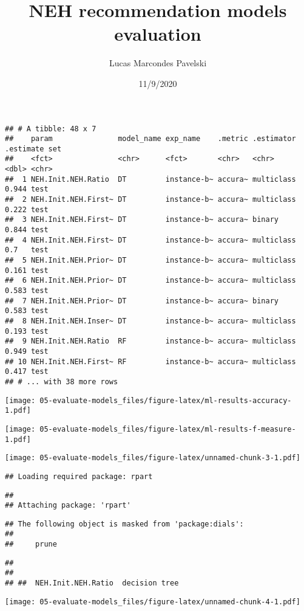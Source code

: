 \documentclass[
]{article}
\title{NEH recommendation models evaluation}
\author{Lucas Marcondes Pavelski}
\date{11/9/2020}
\begin{document}
\maketitle

\begin{verbatim}
## # A tibble: 48 x 7
##    param               model_name exp_name    .metric .estimator .estimate set  
##    <fct>               <chr>      <fct>       <chr>   <chr>          <dbl> <chr>
##  1 NEH.Init.NEH.Ratio  DT         instance-b~ accura~ multiclass     0.944 test 
##  2 NEH.Init.NEH.First~ DT         instance-b~ accura~ multiclass     0.222 test 
##  3 NEH.Init.NEH.First~ DT         instance-b~ accura~ binary         0.844 test 
##  4 NEH.Init.NEH.First~ DT         instance-b~ accura~ multiclass     0.7   test 
##  5 NEH.Init.NEH.Prior~ DT         instance-b~ accura~ multiclass     0.161 test 
##  6 NEH.Init.NEH.Prior~ DT         instance-b~ accura~ multiclass     0.583 test 
##  7 NEH.Init.NEH.Prior~ DT         instance-b~ accura~ binary         0.583 test 
##  8 NEH.Init.NEH.Inser~ DT         instance-b~ accura~ multiclass     0.193 test 
##  9 NEH.Init.NEH.Ratio  RF         instance-b~ accura~ multiclass     0.949 test 
## 10 NEH.Init.NEH.First~ RF         instance-b~ accura~ multiclass     0.417 test 
## # ... with 38 more rows
\end{verbatim}

\texttt{[image: 05-evaluate-models\_files/figure-latex/ml-results-accuracy-1.pdf]}

\texttt{[image: 05-evaluate-models\_files/figure-latex/ml-results-f-measure-1.pdf]}

\texttt{[image: 05-evaluate-models\_files/figure-latex/unnamed-chunk-3-1.pdf]}

\begin{verbatim}
## Loading required package: rpart
\end{verbatim}

\begin{verbatim}
## 
## Attaching package: 'rpart'
\end{verbatim}

\begin{verbatim}
## The following object is masked from 'package:dials':
## 
##     prune
\end{verbatim}

\begin{verbatim}
## 
## 
## ##  NEH.Init.NEH.Ratio  decision tree
\end{verbatim}

\texttt{[image: 05-evaluate-models\_files/figure-latex/unnamed-chunk-4-1.pdf]}
\end{document}
